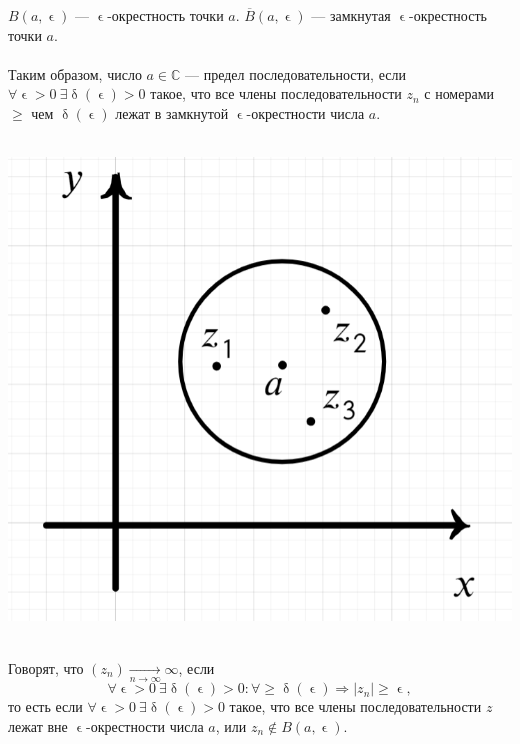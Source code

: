 \documentclass[a4paper, 12pt]{article}
\newcommand{\Cm}{\mathbb{C}}
\renewcommand{\delta}{\updelta}
\renewcommand{\epsilon}{\upvarepsilon}
\newcommand{\limdef}{\forall \epsilon >0\ \exists \delta (\epsilon) > 0}
\begin{document}
\noindent
\parbox[b][4.5cm][t]{95mm}{
	$B(a,\epsilon)$ --- $\epsilon$-окрестность точки $a$. $\overline{B}(a,\epsilon)$ --- замкнутая $\epsilon$-окрестность точки $a$.\\\\
	Таким образом, число $a\in \Cm$ --- предел последовательности, если $\limdef$ такое, что все члены последовательности $z_n$ с номерами $\geqslant$ чем $\delta (\epsilon)$ лежат в замкнутой $\epsilon$-окрестности числа $a$.\\\\
}
\hfill
\parbox[b][4.5cm][t]{70mm}{
	\includegraphics[scale=0.25]{images/012.png}}\\
Говорят, что $(z_n)\underset{n\to\infty}{\longrightarrow} \infty$, если $$\limdef:\forall \geqslant \delta (\epsilon)\Rightarrow |z_n|\geqslant\epsilon,$$
то есть если $\limdef$ такое, что все члены последовательности $z$ лежат вне $\epsilon$-окрестности числа $a$, или $z_n \not \in B(a,\epsilon)$.\\\\
\noindent
\end{document}
